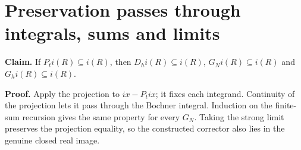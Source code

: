 \documentclass[11pt,a4paper]{article}
\begin{document}
\section{\texorpdfstring{Preservation passes through integrals, sums and limits}{Preservation passes through integrals, sums and limits}}


\textbf{Claim.} If \(P_ti(R)\subseteq i(R)\), then \(D_hi(R)\subseteq i(R)\), \(G_Ni(R)\subseteq i(R)\) and \(G_hi(R)\subseteq i(R)\).



\textbf{Proof.} Apply the projection to \(ix-P_tix\); it fixes each integrand. Continuity of the projection lets it pass through the Bochner integral. Induction on the finite-sum recursion gives the same property for every \(G_N\). Taking the strong limit preserves the projection equality, so the constructed corrector also lies in the genuine closed real image.
\end{document}

